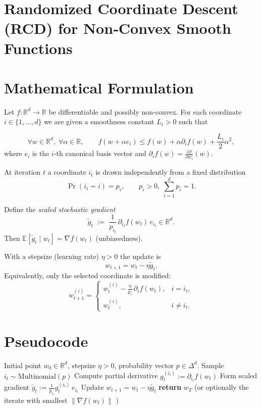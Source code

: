 \documentclass{article}
\newcommand{\E}{\mathbb{E}}
\newcommand{\R}{\mathbb{R}}
\begin{document}
\section*{Randomized Coordinate Descent (RCD) for Non‑Convex Smooth Functions}

\section*{Mathematical Formulation}
Let $f:\R^{d}\rightarrow\R$ be differentiable and possibly non‑convex.  
For each coordinate $i\in\{1,\dots ,d\}$ we are given a smoothness constant $L_i>0$ such that

\[
\forall w\in\R^{d},\;\forall \alpha\in\R,\qquad 
f(w+\alpha e_i)\le f(w)+\alpha \partial_i f(w)+\frac{L_i}{2}\alpha^{2},
\tag{1}
\]
where $e_i$ is the $i$‑th canonical basis vector and $\partial_i f(w)=\frac{\partial f}{\partial w_i}(w)$.

At iteration $t$ a coordinate $i_t$ is drawn independently from a fixed distribution
\[
\Pr(i_t=i)=p_i,\qquad p_i>0,\;\sum_{i=1}^{d}p_i=1 .
\]

Define the \emph{scaled stochastic gradient}
\[
\tilde g_t\;:=\; \frac{1}{p_{i_t}}\,\partial_{i_t}f(w_t)\,e_{i_t}\in\R^{d}.
\tag{2}
\]
Then $\E[\tilde g_t\mid w_t]=\nabla f(w_t)$ (unbiasedness).

With a stepsize (learning rate) $\eta>0$ the update is
\[
w_{t+1}= w_t-\eta \tilde g_t .
\tag{3}
\]
Equivalently, only the selected coordinate is modified:
\[
w_{t+1}^{(i)}=
\begin{cases}
w_t^{(i)}-\displaystyle\frac{\eta}{p_i}\,\partial_i f(w_t), & i=i_t,\\[1ex]
w_t^{(i)}, & i\neq i_t .
\end{cases}
\tag{4}
\]

\section*{Pseudocode}
\begin{algorithm}[H]
\caption{Randomized Coordinate Descent (RCD)}\label{alg:RCD}
\begin{algorithmic}[1]
\Require Initial point $w_0\in\R^{d}$, stepsize $\eta>0$, probability vector $p\in\Delta^{d}$.
    \State Sample $i_t\sim\text{Multinomial}(p)$
    \State Compute partial derivative $g^{(i_t)}_t:=\partial_{i_t}f(w_t)$
    \State Form scaled gradient $\tilde g_t:=\frac{1}{p_{i_t}}g^{(i_t)}_t\,e_{i_t}$
    \State Update $w_{t+1}=w_t-\eta \tilde g_t$
\EndFor
\State \textbf{return} $w_T$ (or optionally the iterate with smallest $ \|\nabla f(w_t)\|$ )
\end{algorithmic}
\end{algorithm}
\end{document}
